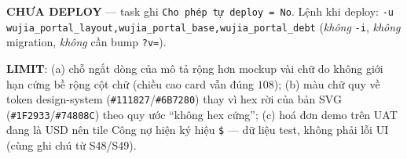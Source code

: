 \textbf{CHƯA DEPLOY} --- task ghi \texttt{Cho phép tự deploy = No}. Lệnh khi deploy:
\texttt{-u wujia\_portal\_layout,wujia\_portal\_base,wujia\_portal\_debt} (\emph{không}
\texttt{-i}, \emph{không} migration, \emph{không} cần bump \texttt{?v=}).

\textbf{LIMIT}: (a) chỗ ngắt dòng của mô tả rộng hơn mockup vài chữ do không giới hạn cứng bề
rộng cột chữ (chiều cao card vẫn đúng $108$); (b) màu chữ quy về token design-system
(\texttt{\#111827}/\texttt{\#6B7280}) thay vì hex rời của bản SVG
(\texttt{\#1F2933}/\texttt{\#74808C}) theo quy ước ``không hex cứng''; (c) hoá đơn demo trên UAT
đang là USD nên tile Công nợ hiện ký hiệu \texttt{\$} --- dữ liệu test, không phải lỗi UI (cùng
ghi chú từ S48/S49).
